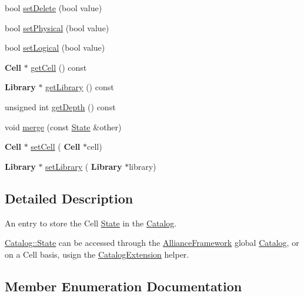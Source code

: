 \begin{DoxyCompactItemize}
\item 
bool \mbox{\hyperlink{classCRL_1_1Catalog_1_1State_a53873a1a42083389dfae02b46b3f2de3}{set\+Delete}} (bool value)
\item 
bool \mbox{\hyperlink{classCRL_1_1Catalog_1_1State_a85a091727c8e7de2b16d01088324de0d}{set\+Physical}} (bool value)
\item 
bool \mbox{\hyperlink{classCRL_1_1Catalog_1_1State_af41327abeb4e7646ef5cafabe8eeabd0}{set\+Logical}} (bool value)
\item 
\textbf{ Cell} $\ast$ \mbox{\hyperlink{classCRL_1_1Catalog_1_1State_a0cc5ef54176f8207ef4e723eed62c35e}{get\+Cell}} () const
\item 
\textbf{ Library} $\ast$ \mbox{\hyperlink{classCRL_1_1Catalog_1_1State_a89dad78f1829b1ee3177f61e2f73d6c6}{get\+Library}} () const
\item 
unsigned int \mbox{\hyperlink{classCRL_1_1Catalog_1_1State_a0232ad6dcfda1e2801f788deaad83e08}{get\+Depth}} () const
\item 
void \mbox{\hyperlink{classCRL_1_1Catalog_1_1State_a41fde67f1b88de06cae113a0d8108f25}{merge}} (const \mbox{\hyperlink{classCRL_1_1Catalog_1_1State}{State}} \&other)
\item 
\textbf{ Cell} $\ast$ \mbox{\hyperlink{classCRL_1_1Catalog_1_1State_a156714ad3fe2e5bb8ad8549d101526fe}{set\+Cell}} (\textbf{ Cell} $\ast$cell)
\item 
\textbf{ Library} $\ast$ \mbox{\hyperlink{classCRL_1_1Catalog_1_1State_a821ac2ae33f0045232cab612ab12f84b}{set\+Library}} (\textbf{ Library} $\ast$library)
\end{DoxyCompactItemize}


\subsection{Detailed Description}
An entry to store the Cell \mbox{\hyperlink{classCRL_1_1Catalog_1_1State}{State}} in the \mbox{\hyperlink{classCRL_1_1Catalog}{Catalog}}. 

\mbox{\hyperlink{classCRL_1_1Catalog_1_1State}{Catalog\+::\+State}} can be accessed through the \mbox{\hyperlink{classCRL_1_1AllianceFramework}{Alliance\+Framework}} global \mbox{\hyperlink{classCRL_1_1Catalog}{Catalog}}, or on a Cell basis, usign the \mbox{\hyperlink{classCRL_1_1CatalogExtension}{Catalog\+Extension}} helper. 

\subsection{Member Enumeration Documentation}
\mbox{\label{classCRL_1_1Catalog_1_1State_a625003526d38ac7500b4ad7de35e2d74}} 
